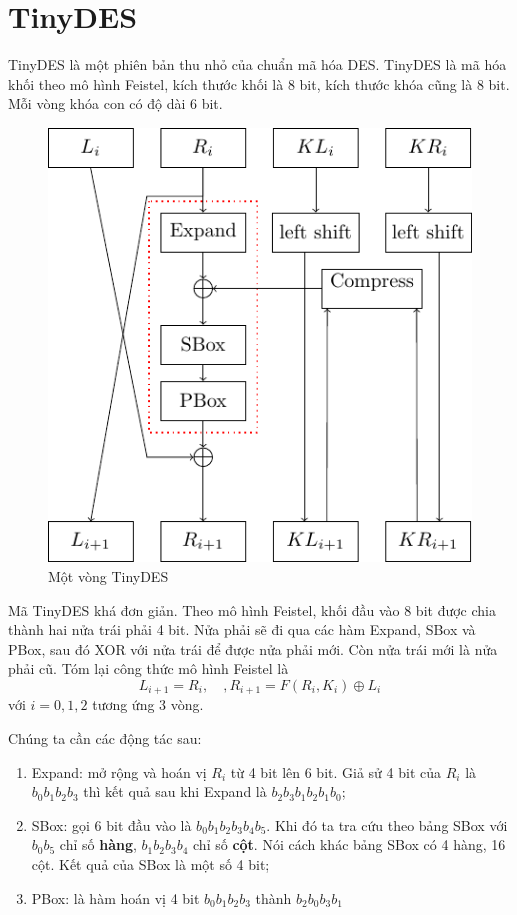 \chapter{TinyDES}

TinyDES là một phiên bản thu nhỏ của chuẩn mã hóa DES. TinyDES
là mã hóa khối theo mô hình Feistel, kích thước khối là 8 bit, kích
thước khóa cũng là 8 bit. Mỗi vòng khóa con có độ dài 6 bit.

\begin{figure}[ht]
    \centering
    \includegraphics{TinyDES/blocky.pdf}
    \caption{Một vòng TinyDES}
\end{figure}

Mã TinyDES khá đơn giản. Theo mô hình Feistel, khối đầu vào 8 bit được chia thành
hai nửa trái phải 4 bit. Nửa phải sẽ đi qua các hàm Expand, SBox và PBox, sau đó
XOR với nửa trái để được nửa phải mới. Còn nửa trái mới là nửa phải cũ. Tóm lại 
công thức mô hình Feistel là
\[L_{i+1} = R_i, \quad, R_{i+1} = F(R_i, K_i) \oplus L_i\]
với $i = 0, 1, 2$ tương ứng 3 vòng.

Chúng ta cần các động tác sau:

\begin{enumerate}
    \item Expand: mở rộng và hoán vị $R_i$ từ 4 bit lên 6 bit. Giả sử 4 bit
    của $R_i$ là $b_0 b_1 b_2 b_3$ thì kết quả sau khi Expand là $b_2 b_3 b_1
    b_2 b_1 b_0$;
    \item SBox: gọi 6 bit đầu vào là $b_0 b_1 b_2 b_3 b_4 b_5$. Khi đó ta tra
    cứu theo bảng SBox với $b_0 b_5$ chỉ số \textbf{hàng}, $b_1 b_2 b_3 b_4$ chỉ
    số \textbf{cột}. Nói cách khác bảng SBox có 4 hàng, 16 cột. Kết quả của SBox
    là một số 4 bit;
    \item PBox: là hàm hoán vị 4 bit $b_0 b_1 b_2 b_3$ thành $b_2 b_0 b_3 b_1$
\end{enumerate}

